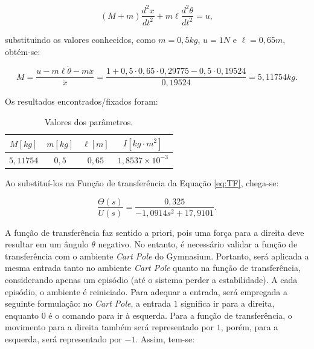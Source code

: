 \documentclass[12pt,           %
a4paper,                       %
openany,                       %
oneside,                       %
chapter=TITLE,                 %
english,                       %
spanish,                       %
brazil,                        %
sumario=tradicional]{abntex2}  %
\begin{document}
\begin{OnehalfSpace}
\begin{equation}
    (M + m)\frac{d^2 x}{dt^2} + m\ell \frac{d^2 \theta}{dt^2} = u,
    \label{eq:M}
\end{equation}

\noindent substituindo os valores conhecidos, como $m = 0,5kg$, $u = 1N$ e $\ell = 0,65m$, obtém-se:

\begin{equation}
    M = \frac{u - m\ell\ddot{\theta}-m\ddot{x}}{\ddot{x}} = \frac{1 + 0,5\cdot 0,65\cdot 0,29775 - 0,5\cdot 0,19524}{0,19524} = 5,11754 kg.
    \label{eq:Mn}
\end{equation}

Os resultados encontrados/fixados foram:

\begin{table}[H]
	\centering
	\vspace*{-0.2cm}
	\caption{Valores dos parâmetros.}
    \begin{tabular}{|c|c|c|c|}
            \hline
            $M [kg]$ & $m [kg]$ & $\ell [m]$ & $I[kg\cdot m^2]$\\
            \hline
            $5,11754$ & $0,5$ & $0,65$ & $1,8537\times 10^{-3}$ \\
            \hline
        \end{tabular}
        \label{tab:outlunarlander}                 %
 \end{table}
\vspace*{-0.675cm}
{\raggedright {}}

Ao substituí-los na Função de transferência da Equação \ref{eq:TF}, chega-se:

\begin{equation}
     \frac{\Theta (s)}{U(s)} = \frac{0,325}{-1,0914s^2 + 17,9101}.
    \label{eq:FT1}
\end{equation}

A função de transferência faz sentido a priori, pois uma força para a direita deve resultar em um ângulo $\theta$ negativo. No entanto, é necessário validar a função de transferência com o ambiente \textit{Cart Pole} do Gymnasium. Portanto, será aplicada a mesma entrada tanto no ambiente \textit{Cart Pole} quanto na função de transferência, considerando apenas um episódio (até o sistema perder a estabilidade). A cada episódio, o ambiente é reiniciado. Para adequar a entrada, será empregada a seguinte formulação: no \textit{Cart Pole}, a entrada $1$ significa ir para a direita, enquanto $0$ é o comando para ir à esquerda. Para a função de transferência, o movimento para a direita também será representado por $1$, porém, para a esquerda, será representado por $-1$. Assim, tem-se:


\end{OnehalfSpace}
\end{document}
